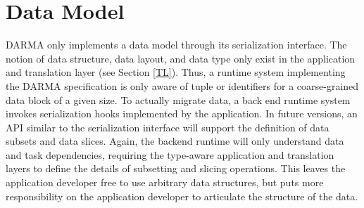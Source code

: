 
\section{Data Model}
\label{sec:data_model}
\gls{DARMA} only implements a \gls{data model} through its \gls{serialization} interface.
The notion of data structure, data layout, and data type only exist in the
application and \gls{translation layer} (see Section \ref{TL}).
Thus, a \gls{runtime system} implementing the \gls{DARMA} specification is only
aware of \gls{tuple} or  identifiers for a coarse-grained data block of a given size.
To actually migrate data, a \gls{back end} \gls{runtime system} invokes
\gls{serialization} hooks implemented by the application.
In future versions, an \gls{API} similar to the \gls{serialization} interface will support the definition of data subsets and data slices.
Again, the backend runtime will only understand data and task dependencies,
  requiring the type-aware application and \glspl{translation layer} to define
  the details of subsetting and slicing operations.
This leaves the application developer free to use arbitrary data structures,
     but puts more responsibility on the application developer to articulate
     the structure of the data.


